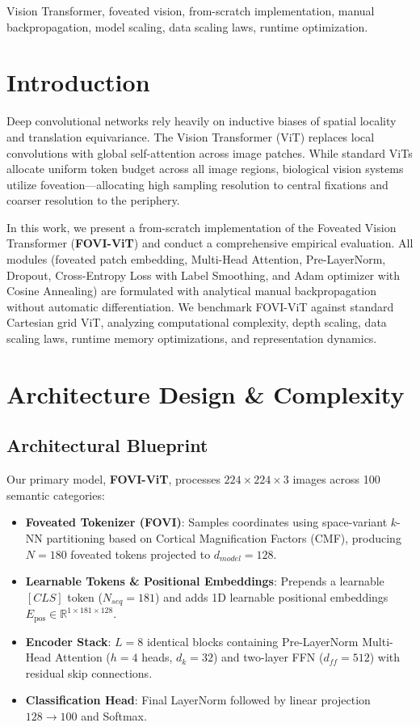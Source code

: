\documentclass[10pt,conference]{IEEEtran}
\begin{document}
\begin{IEEEkeywords}
Vision Transformer, foveated vision, from-scratch implementation, manual backpropagation, model scaling, data scaling laws, runtime optimization.
\end{IEEEkeywords}

\section{Introduction}
Deep convolutional networks rely heavily on inductive biases of spatial locality and translation equivariance. The Vision Transformer (ViT) replaces local convolutions with global self-attention across image patches. While standard ViTs allocate uniform token budget across all image regions, biological vision systems utilize foveation—allocating high sampling resolution to central fixations and coarser resolution to the periphery.

In this work, we present a from-scratch implementation of the Foveated Vision Transformer (\textbf{FOVI-ViT}) and conduct a comprehensive empirical evaluation. All modules (foveated patch embedding, Multi-Head Attention, Pre-LayerNorm, Dropout, Cross-Entropy Loss with Label Smoothing, and Adam optimizer with Cosine Annealing) are formulated with analytical manual backpropagation without automatic differentiation. We benchmark FOVI-ViT against standard Cartesian grid ViT, analyzing computational complexity, depth scaling, data scaling laws, runtime memory optimizations, and representation dynamics.

\section{Architecture Design \& Complexity}

\subsection{Architectural Blueprint}
Our primary model, \textbf{FOVI-ViT}, processes $224 \times 224 \times 3$ images across 100 semantic categories:
\begin{itemize}
    \item \textbf{Foveated Tokenizer (FOVI)}: Samples coordinates using space-variant $k$-NN partitioning based on Cortical Magnification Factors (CMF), producing $N=180$ foveated tokens projected to $d_{model}=128$.
    \item \textbf{Learnable Tokens \& Positional Embeddings}: Prepends a learnable $[CLS]$ token ($N_{seq}=181$) and adds 1D learnable positional embeddings $E_{\text{pos}} \in \mathbb{R}^{1 \times 181 \times 128}$.
    \item \textbf{Encoder Stack}: $L=8$ identical blocks containing Pre-LayerNorm Multi-Head Attention ($h=4$ heads, $d_k=32$) and two-layer FFN ($d_{ff}=512$) with residual skip connections.
    \item \textbf{Classification Head}: Final LayerNorm followed by linear projection $128 \to 100$ and Softmax.
\end{itemize}
\end{document}
